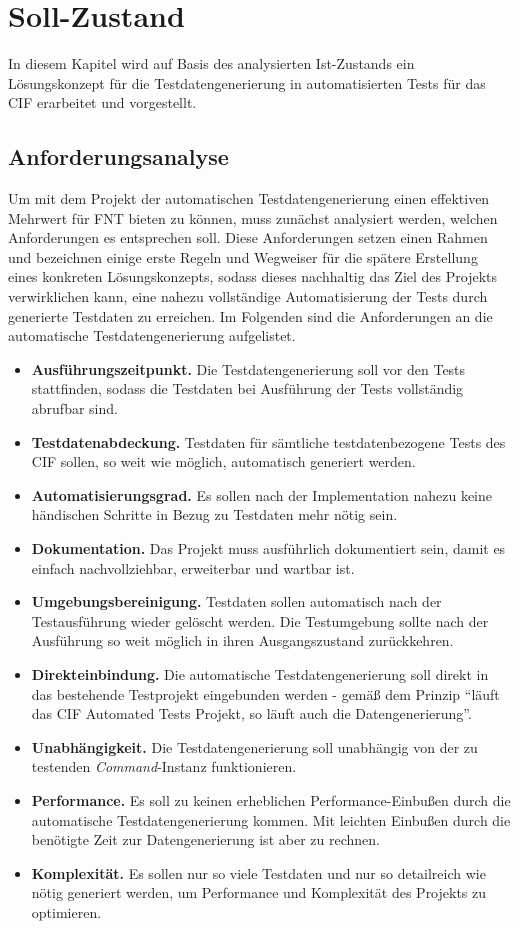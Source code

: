 \chapter{Soll-Zustand}\label{ch:sollzustand}
In diesem Kapitel wird auf Basis des analysierten Ist-Zustands ein Lösungskonzept für die Testdatengenerierung in automatisierten Tests für das \ac{CIF} erarbeitet und vorgestellt.

\section{Anforderungsanalyse}\label{sec:anforderungen}
Um mit dem Projekt der automatischen Testdatengenerierung einen effektiven Mehrwert für FNT bieten zu können, muss zunächst analysiert werden, welchen Anforderungen es entsprechen soll. Diese Anforderungen setzen einen Rahmen und bezeichnen einige erste Regeln und Wegweiser für die spätere Erstellung eines konkreten Lösungskonzepts, sodass dieses nachhaltig das Ziel des Projekts verwirklichen kann, eine nahezu vollständige Automatisierung der Tests durch generierte Testdaten zu erreichen. Im Folgenden sind die Anforderungen an die automatische Testdatengenerierung aufgelistet.

\begin{itemize}
    \item \textbf{Ausführungszeitpunkt.} Die Testdatengenerierung soll vor den Tests stattfinden, sodass die Testdaten bei Ausführung der Tests vollständig abrufbar sind.
    \item \textbf{Testdatenabdeckung.} Testdaten für sämtliche testdatenbezogene Tests des CIF sollen, so weit wie möglich, automatisch generiert werden.
    \item \textbf{Automatisierungsgrad.} Es sollen nach der Implementation nahezu keine händischen Schritte in Bezug zu Testdaten mehr nötig sein.
    \item \textbf{Dokumentation.} Das Projekt muss ausführlich dokumentiert sein, damit es einfach nachvollziehbar, erweiterbar und wartbar ist.
    \item \textbf{Umgebungsbereinigung.} Testdaten sollen automatisch nach der Testausführung wieder gelöscht werden. Die Testumgebung sollte nach der Ausführung so weit möglich in ihren Ausgangszustand zurückkehren.
    \item \textbf{Direkteinbindung.} Die automatische Testdatengenerierung soll direkt in das bestehende Testprojekt eingebunden werden - gemäß dem Prinzip \enquote{läuft das \ac{CIF} Automated Tests Projekt, so läuft auch die Datengenerierung}.
    \item \textbf{Unabhängigkeit.} Die Testdatengenerierung soll unabhängig von der zu testenden \textit{Command}-Instanz funktionieren.
    \item \textbf{Performance.} Es soll zu keinen erheblichen Performance-Einbußen durch die automatische Testdatengenerierung kommen. Mit leichten Einbußen durch die benötigte Zeit zur Datengenerierung ist aber zu rechnen.
    \item \textbf{Komplexität.} Es sollen nur so viele Testdaten und nur so detailreich wie nötig generiert werden, um Performance und Komplexität des Projekts zu optimieren.
\end{itemize}

